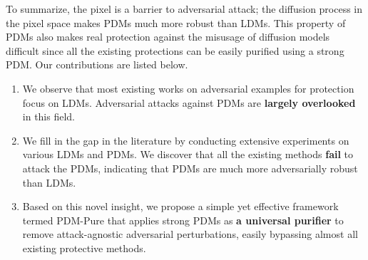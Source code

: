 \documentclass{article}
\newcommand{\chen}[1]{{\color{cyan}{#1}}}
\begin{document}



To summarize, the pixel is a barrier to adversarial attack; the diffusion process in the pixel space makes PDMs much more robust than LDMs. This property of PDMs also makes real protection against the misusage of diffusion models difficult since all the existing protections can be easily purified using a strong PDM. Our contributions are listed below.

\begin{enumerate}[parsep=0pt,topsep=0pt,leftmargin=12pt]
    \item We observe that most existing works on adversarial examples for protection focus on LDMs. Adversarial attacks against PDMs are \textbf{largely overlooked} in this field. 
    \item We fill in the gap in the literature by conducting extensive experiments on various LDMs and PDMs. We discover that all the existing methods \textbf{fail} to attack the PDMs, indicating that PDMs are much more adversarially robust than LDMs.
    \item Based on this novel insight, we propose a simple yet effective framework termed PDM-Pure that applies strong PDMs as \textbf{a universal purifier} to remove attack-agnostic adversarial perturbations, easily bypassing almost all existing protective methods. 

\end{enumerate}
\end{document}
